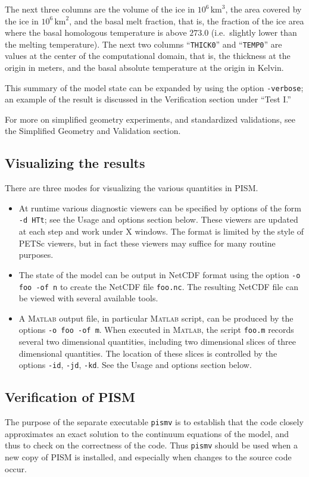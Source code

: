 \documentclass[11pt,final]{amsart}
\renewcommand{\t}[1]{\texttt{#1}}
\newcommand{\Matlab}{\textsc{Matlab}\xspace}
\begin{document}
The next three columns are the volume of the ice in $10^6 \,\text{km}^3$, the area covered by the ice in $10^6\,\text{km}^2$, and the basal melt fraction, that is, the fraction of the ice area where the basal homologous temperature is above $273.0$ (i.e.~slightly lower than the melting temperature).  The next two columns ``\texttt{THICK0}'' and ``\texttt{TEMP0}'' are values at the center of the computational domain, that is, the thickness at the origin in meters, and the basal absolute temperature at the origin in Kelvin.

This summary of the model state can be expanded by using the option \verb|-verbose|; an example of the result is discussed in the Verification section under ``Test I.''

For more on simplified geometry experiments, and standardized validations, see the Simplified Geometry and Validation section.

\subsection{Visualizing the results}  There are three modes for visualizing the various quantities in PISM.\begin{itemize}
\item At runtime various diagnostic viewers can be specified by options of the form \verb|-d HTt|; see the Usage and options section below.  These viewers are updated at each step and work under X windows.  The format is limited by the style of PETSc viewers, but in fact these viewers may suffice for many routine purposes.
\item The state of the model can be output in NetCDF format using the option \verb|-o foo -of n| to create the NetCDF file \verb|foo.nc|.  The resulting NetCDF file can be viewed with several available tools.
\item A \Matlab output file, in particular \Matlab script, can be produced by the options \verb|-o foo -of m|.  When executed in \Matlab, the script \verb|foo.m| records several two dimensional quantities, including two dimensional slices of three dimensional quantities.  The location of these slices is controlled by the options \verb|-id|, \verb|-jd|, \verb|-kd|.  See the Usage and options section below.
\end{itemize}


\subsection{Verification of PISM}  The purpose of the separate executable \t{pismv} is to establish that the code closely approximates an exact solution to the continuum equations of the model, and thus to check on the correctness of the code.  Thus \t{pismv} should be used when a new copy of PISM is installed, and especially when changes to the source code occur.
\end{document}
